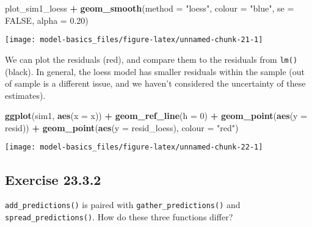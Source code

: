 \documentclass[]{book}
\newenvironment{Shaded}{\begin{snugshade}}{\end{snugshade}}
\newcommand{\DataTypeTok}[1]{\textcolor[rgb]{0.13,0.29,0.53}{#1}}
\newcommand{\DecValTok}[1]{\textcolor[rgb]{0.00,0.00,0.81}{#1}}
\newcommand{\FloatTok}[1]{\textcolor[rgb]{0.00,0.00,0.81}{#1}}
\newcommand{\KeywordTok}[1]{\textcolor[rgb]{0.13,0.29,0.53}{\textbf{#1}}}
\newcommand{\NormalTok}[1]{#1}
\newcommand{\OperatorTok}[1]{\textcolor[rgb]{0.81,0.36,0.00}{\textbf{#1}}}
\newcommand{\OtherTok}[1]{\textcolor[rgb]{0.56,0.35,0.01}{#1}}
\newcommand{\StringTok}[1]{\textcolor[rgb]{0.31,0.60,0.02}{#1}}
\theoremstyle{plain}
\theoremstyle{remark}
\theoremstyle{definition}
\theoremstyle{definition}
\theoremstyle{definition}
\theoremstyle{remark}
\begin{document}
\begin{Shaded}
\begin{Highlighting}[]
\NormalTok{plot_sim1_loess }\OperatorTok{+}
\StringTok{  }\KeywordTok{geom_smooth}\NormalTok{(}\DataTypeTok{method =} \StringTok{"loess"}\NormalTok{, }\DataTypeTok{colour =} \StringTok{"blue"}\NormalTok{, }\DataTypeTok{se =} \OtherTok{FALSE}\NormalTok{, }\DataTypeTok{alpha =} \FloatTok{0.20}\NormalTok{)}
\end{Highlighting}
\end{Shaded}

\begin{center}\texttt{[image: model-basics\_files/figure-latex/unnamed-chunk-21-1]} \end{center}

We can plot the residuals (red), and compare them to the residuals from
\texttt{lm()} (black). In general, the loess model has smaller residuals
within the sample (out of sample is a different issue, and we haven't
considered the uncertainty of these estimates).

\begin{Shaded}
\begin{Highlighting}[]
\KeywordTok{ggplot}\NormalTok{(sim1, }\KeywordTok{aes}\NormalTok{(}\DataTypeTok{x =}\NormalTok{ x)) }\OperatorTok{+}
\StringTok{  }\KeywordTok{geom_ref_line}\NormalTok{(}\DataTypeTok{h =} \DecValTok{0}\NormalTok{) }\OperatorTok{+}
\StringTok{  }\KeywordTok{geom_point}\NormalTok{(}\KeywordTok{aes}\NormalTok{(}\DataTypeTok{y =}\NormalTok{ resid)) }\OperatorTok{+}
\StringTok{  }\KeywordTok{geom_point}\NormalTok{(}\KeywordTok{aes}\NormalTok{(}\DataTypeTok{y =}\NormalTok{ resid_loess), }\DataTypeTok{colour =} \StringTok{"red"}\NormalTok{)}
\end{Highlighting}
\end{Shaded}

\begin{center}\texttt{[image: model-basics\_files/figure-latex/unnamed-chunk-22-1]} \end{center}

\hypertarget{exercise-23.3.2}{%
\subsection*{\texorpdfstring{Exercise
{23.3.2}}{Exercise 23.3.2}}\label{exercise-23.3.2}}

\texttt{add\_predictions()} is paired with
\texttt{gather\_predictions()} and \texttt{spread\_predictions()}. How
do these three functions differ?
\end{document}

